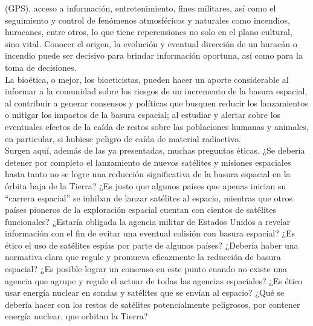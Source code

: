 \documentclass[12pt,letterpaper]{article}
\begin{document}
\pagestyle{fancy}
        \fancyhf{}
        \rhead{}
\begin{multicols}{2}
\noindent (GPS), acceso a información, entretenimiento, fines
militares, así como el seguimiento y control de fenómenos
atmosféricos y naturales como incendios, huracanes,
entre otros, lo que tiene repercusiones no solo en el
plano cultural, sino vital. Conocer el origen, la evolución
y eventual dirección de un huracán o incendio puede ser
decisivo para brindar información oportuna, así como
para la toma de decisiones.
\\

\noindent La bioética, o mejor, los bioeticistas, pueden hacer un
aporte considerable al informar a la comunidad sobre
los riesgos de un incremento de la basura espacial, al
contribuir a generar consensos y políticas que busquen
reducir los lanzamientos o mitigar los impactos de la
basura espacial; al estudiar y alertar sobre los eventuales efectos de la caída de restos sobre las poblaciones
humanas y animales, en particular, si hubiese peligro de
caída de material radiactivo.
\\

\noindent Surgen aquí, además de las ya presentadas, muchas
preguntas éticas. ¿Se debería detener por completo el
lanzamiento de nuevos satélites y misiones espaciales
hasta tanto no se logre una reducción significativa de la
basura espacial en la órbita baja de la Tierra? ¿Es justo
que algunos países que apenas inician su “carrera espacial” se inhiban de lanzar satélites al espacio, mientras
que otros países pioneros de la exploración espacial
cuentan con cientos de satélites funcionales? ¿Estaría
obligada la agencia militar de Estados Unidos a revelar
información con el fin de evitar una eventual colisión con
basura espacial? ¿Es ético el uso de satélites espías por
parte de algunos países? ¿Debería haber una normativa
clara que regule y promueva eficazmente la reducción
de basura espacial? ¿Es posible lograr un consenso en
este punto cuando no existe una agencia que agrupe y
regule el actuar de todas las agencias espaciales? ¿Es ético usar energía nuclear en sondas y satélites que se envían al espacio? ¿Qué se debería hacer con los restos de  satélites  potencialmente  peligrosos,  por  contener  energía nuclear, que orbitan la Tierra?

\end{multicols}
\end{document}
